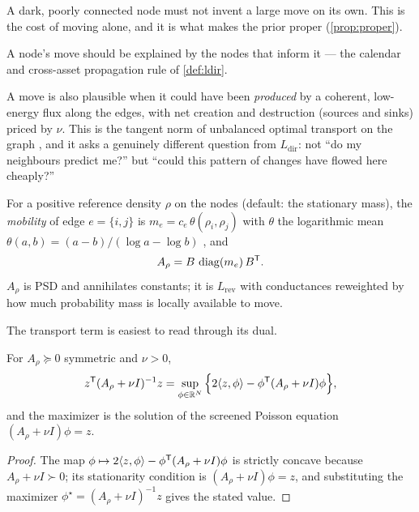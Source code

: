 \documentclass[11pt]{article}
\newcommand{\Ldir}{L_{\mathrm{dir}}}
\newcommand{\Lrev}{L_{\mathrm{rev}}}
\newcommand{\Arho}{A_{\rho}}
\begin{document}
\begin{description}[leftmargin=1.7em,style=nextline]
\item[Local smallness, $D_\kappa=\diag(\kappa)$, $\kappa_i>0$.]
A dark, poorly connected node must not invent a large move on its own. This is
the cost of moving alone, and it is what makes the prior proper
(\cref{prop:proper}).
\item[Directed prediction, $\eta\,\Ldir^{\beta}$.]
A node's move should be explained by the nodes that inform it --- the calendar
and cross-asset propagation rule of \cref{def:ldir}.
\item[Transport tangent norm, $\lambda\,(\Arho+\nu I)^{-1}$.]
A move is also plausible when it could have been \emph{produced} by a coherent,
low-energy flux along the edges, with net creation and destruction (sources and
sinks) priced by $\nu$. This is the tangent norm of unbalanced optimal transport
on the graph \cite{Chizat2018,Peyre2019}, and it asks a genuinely different
question from $\Ldir$: not ``do my neighbours predict me?'' but ``could this
pattern of changes have flowed here cheaply?''
\end{description}

\begin{definition}
\label{def:mobility}
For a positive reference density $\rho$ on the nodes (default: the stationary
mass), the \emph{mobility} of edge $e=\{i,j\}$ is
$m_e=c_e\,\theta(\rho_i,\rho_j)$ with $\theta$ the logarithmic mean
$\theta(a,b)=(a-b)/(\log a-\log b)$ \cite{Maas2011}, and
\[
\Arho=B\,\diag(m_e)\,B\T .
\]
$\Arho$ is PSD and annihilates constants; it is $\Lrev$ with conductances
reweighted by how much probability mass is locally available to move.
\end{definition}

The transport term is easiest to read through its dual.

\begin{proposition}
\label{prop:ot-dual}
For $\Arho\succeq0$ symmetric and $\nu>0$,
\[
z\T(\Arho+\nu I)^{-1}z
=\sup_{\phi\in\R^N}\Big\{2\inner{z,\phi}-\phi\T(\Arho+\nu I)\phi\Big\},
\]
and the maximizer is the solution of the screened Poisson equation
$(\Arho+\nu I)\phi=z$.
\end{proposition}

\begin{proof}
The map $\phi\mapsto2\inner{z,\phi}-\phi\T(\Arho+\nu I)\phi$ is strictly concave
because $\Arho+\nu I\succ0$; its stationarity condition is
$(\Arho+\nu I)\phi=z$, and substituting the maximizer
$\phi^\star=(\Arho+\nu I)^{-1}z$ gives the stated value.
\end{proof}
\end{document}
